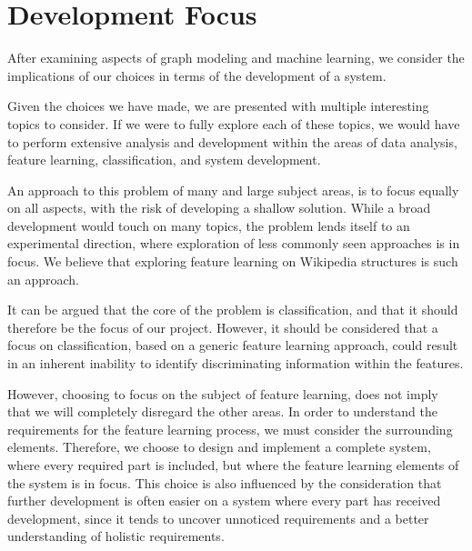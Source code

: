 \section{Development Focus}
After examining aspects of graph modeling and machine learning, we consider the implications of our choices in terms of the development of a system.

Given the choices we have made, we are presented with multiple interesting topics to consider. If we were to fully explore each of these topics, we would have to perform extensive analysis and development within the areas of data analysis, feature learning, classification, and system development.

An approach to this problem of many and large subject areas, is to focus equally on all aspects, with the risk of developing a shallow solution. While a broad development would touch on many topics, the problem lends itself to an experimental direction, where exploration of less commonly seen approaches is in focus. We believe that exploring feature learning on Wikipedia structures is such an approach.

It can be argued that the core of the problem is classification, and that it should therefore be the focus of our project. However, it should be considered that a focus on classification, based on a generic feature learning approach, could result in an inherent inability to identify discriminating information within the features. 

However, choosing to focus on the subject of feature learning, does not imply that we will completely disregard the other areas. In order to understand the requirements for the feature learning process, we must consider the surrounding elements. Therefore, we choose to design and implement a complete system, where every required part is included, but where the feature learning elements of the system is in focus. This choice is also influenced by the consideration that further development is often easier on a system where every part has received development, since it tends to uncover unnoticed requirements and a better understanding of holistic requirements.